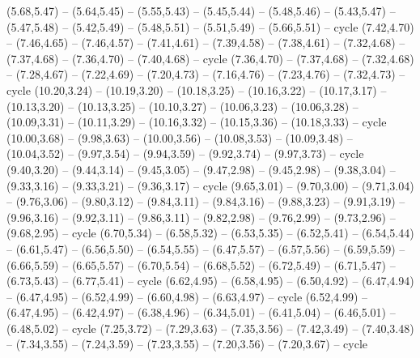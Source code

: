 \expandafter\def\csname geo:gebiet:ISL\endcsname{
  (5.68,5.47) -- (5.64,5.45) -- (5.55,5.43) -- (5.45,5.44) -- (5.48,5.46) -- (5.43,5.47) -- (5.47,5.48) -- (5.42,5.49) -- (5.48,5.51) -- (5.51,5.49) -- (5.66,5.51) -- cycle}
\expandafter\def\csname geo:gebiet:AZE\endcsname{
  (7.42,4.70) -- (7.46,4.65) -- (7.46,4.57) -- (7.41,4.61) -- (7.39,4.58) -- (7.38,4.61) -- (7.32,4.68) -- (7.37,4.68) -- (7.36,4.70) -- (7.40,4.68) -- cycle}
\expandafter\def\csname geo:gebiet:GEO\endcsname{
  (7.36,4.70) -- (7.37,4.68) -- (7.32,4.68) -- (7.28,4.67) -- (7.22,4.69) -- (7.20,4.73) -- (7.16,4.76) -- (7.23,4.76) -- (7.32,4.73) -- cycle}
\expandafter\def\csname geo:gebiet:PHL\endcsname{
  (10.20,3.24) -- (10.19,3.20) -- (10.18,3.25) -- (10.16,3.22) -- (10.17,3.17) -- (10.13,3.20) -- (10.13,3.25) -- (10.10,3.27) -- (10.06,3.23) -- (10.06,3.28) -- (10.09,3.31) -- (10.11,3.29) -- (10.16,3.32) -- (10.15,3.36) -- (10.18,3.33) -- cycle
  (10.00,3.68) -- (9.98,3.63) -- (10.00,3.56) -- (10.08,3.53) -- (10.09,3.48) -- (10.04,3.52) -- (9.97,3.54) -- (9.94,3.59) -- (9.92,3.74) -- (9.97,3.73) -- cycle}
\expandafter\def\csname geo:gebiet:MYS\endcsname{
  (9.40,3.20) -- (9.44,3.14) -- (9.45,3.05) -- (9.47,2.98) -- (9.45,2.98) -- (9.38,3.04) -- (9.33,3.16) -- (9.33,3.21) -- (9.36,3.17) -- cycle
  (9.65,3.01) -- (9.70,3.00) -- (9.71,3.04) -- (9.76,3.06) -- (9.80,3.12) -- (9.84,3.11) -- (9.84,3.16) -- (9.88,3.23) -- (9.91,3.19) -- (9.96,3.16) -- (9.92,3.11) -- (9.86,3.11) -- (9.82,2.98) -- (9.76,2.99) -- (9.73,2.96) -- (9.68,2.95) -- cycle}
\expandafter\def\csname geo:gebiet:BRN\endcsname{
  }
\expandafter\def\csname geo:gebiet:SVN\endcsname{
  }
\expandafter\def\csname geo:gebiet:FIN\endcsname{
  (6.70,5.34) -- (6.58,5.32) -- (6.53,5.35) -- (6.52,5.41) -- (6.54,5.44) -- (6.61,5.47) -- (6.56,5.50) -- (6.54,5.55) -- (6.47,5.57) -- (6.57,5.56) -- (6.59,5.59) -- (6.66,5.59) -- (6.65,5.57) -- (6.70,5.54) -- (6.68,5.52) -- (6.72,5.49) -- (6.71,5.47) -- (6.73,5.43) -- (6.77,5.41) -- cycle}
\expandafter\def\csname geo:gebiet:SVK\endcsname{
  (6.62,4.95) -- (6.58,4.95) -- (6.50,4.92) -- (6.47,4.94) -- (6.47,4.95) -- (6.52,4.99) -- (6.60,4.98) -- (6.63,4.97) -- cycle}
\expandafter\def\csname geo:gebiet:CZE\endcsname{
  (6.52,4.99) -- (6.47,4.95) -- (6.42,4.97) -- (6.38,4.96) -- (6.34,5.01) -- (6.41,5.04) -- (6.46,5.01) -- (6.48,5.02) -- cycle}
\expandafter\def\csname geo:gebiet:ERI\endcsname{
  (7.25,3.72) -- (7.29,3.63) -- (7.35,3.56) -- (7.42,3.49) -- (7.40,3.48) -- (7.34,3.55) -- (7.24,3.59) -- (7.23,3.55) -- (7.20,3.56) -- (7.20,3.67) -- cycle}
